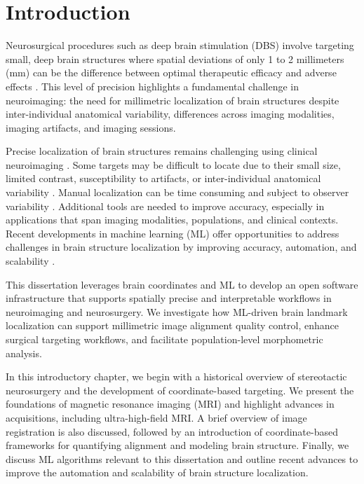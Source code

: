 \chapter{Introduction}\label{chap:intro}
\newpage
\sloppy

Neurosurgical procedures such as deep brain stimulation (DBS) involve targeting small, deep brain structures where spatial deviations of only 1 to 2 millimeters (mm) can be the difference between optimal therapeutic efficacy and adverse effects \cite{Horn2018-qq}. This level of precision highlights a fundamental challenge in neuroimaging: the need for millimetric localization of brain structures despite inter-individual anatomical variability, differences across imaging modalities, imaging artifacts, and imaging sessions.

Precise localization of brain structures remains challenging using clinical neuroimaging \cite{Boutet2021-vg}. Some targets may be difficult to locate due to their small size, limited contrast, susceptibility to artifacts, or inter-individual anatomical variability \cite{Lau2020-dh}. Manual localization can be time consuming and subject to observer variability \cite{Miller2023-ct}. Additional tools are needed to improve accuracy, especially in applications that span imaging modalities, populations, and clinical contexts. Recent developments in machine learning (ML) offer opportunities to address challenges in brain structure localization by improving accuracy, automation, and scalability \cite{Andrews2025-kd}.

This dissertation leverages brain coordinates and ML to develop an open software infrastructure that supports spatially precise and interpretable workflows in neuroimaging and neurosurgery. We investigate how ML-driven brain landmark localization can support millimetric image alignment quality control, enhance surgical targeting workflows, and facilitate population-level morphometric analysis.

In this introductory chapter, we begin with a historical overview of stereotactic neurosurgery and the development of coordinate-based targeting. We present the foundations of magnetic resonance imaging (MRI) and highlight advances in acquisitions, including ultra-high-field MRI. A brief overview of image registration is also discussed, followed by an introduction of coordinate-based frameworks for quantifying alignment and modeling brain structure. Finally, we discuss ML algorithms relevant to this dissertation and outline recent advances to improve the automation and scalability of brain structure localization.

